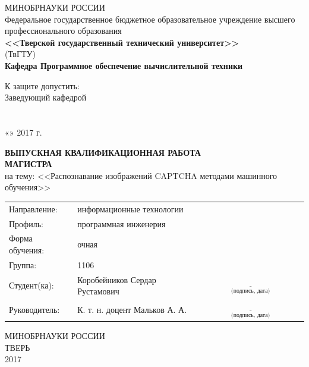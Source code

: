 \documentclass[a4paper,12pt,russian]{article} %
\begin{document}

\begin{titlepage}	%
\begin{center}
	МИНОБРНАУКИ РОССИИ\\
	Федеральное государственное бюджетное образовательное учреждение высшего профессионального образования\\
	\textbf{<<Тверской государственный технический университет>>}\\
	(ТвГТУ)\\
	\vspace{0.5cm}
	\textbf{Кафедра Программное обеспечение вычислительной техники}
\end{center}
\vspace{0.3cm}
\begin{small}\begin{flushright}
	К защите допустить:\\
	Заведующий кафедрой\\
	\underline{\hspace{3.cm}} \\
	\underline{\hspace{5.cm}} \\
	«\underline{\hspace{0.7cm}}» \underline{\hspace{2cm}} 2017 г.
\end{flushright}\end{small}
\vspace{0.3cm}
\begin{center}
	\textbf{ВЫПУСКНАЯ КВАЛИФИКАЦИОННАЯ РАБОТА\\МАГИСТРА\\}
	\vspace{0.4cm}
	на тему: <<Распознавание изображений CAPTCHA методами машинного обучения>>
\end{center}
\vspace{2.6cm}
\begin{small}\begin{listliketab}\begin{tabular}{p{3cm} p{8cm} p{5cm}}
		Направление: 				& информационные технологии 			&\\
		Профиль: 					& программная инженерия 				& \\
		Форма обучения: 		& очная								 				& \\
		Группа: 						& 1106 												& \\
		Студент(ка): 				& Коробейников Сердар Рустамович & $\underset{\text{(подпись, дата)}}{\underline{\hspace{5cm}}}$ \\
		Руководитель: 			& К. т. н. доцент Мальков А. А. 			& $\underset{\text{(подпись, дата)}}{\underline{\hspace{5cm}}}$
\end{tabular}\end{listliketab}\end{small}
\vfill
\begin{center}МИНОБРНАУКИ РОССИИ\\ТВЕРЬ\\2017\end{center}
\end{titlepage}
\end{document}
